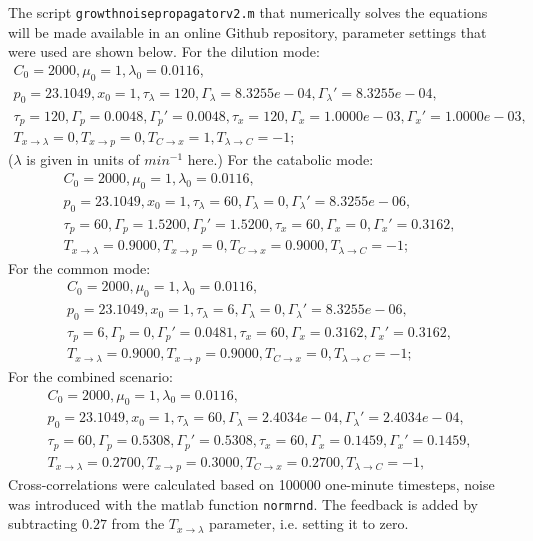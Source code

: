 The script \texttt{growthnoisepropagatorv2.m} that numerically solves the equations will be made available in an online Github repository, parameter settings that were used are shown below.
%
For the dilution mode: 
\begin{gather*}
C_0= 2000,
\mu_0= 1,
\lambda_0= 0.0116, 
\nonumber \\ p_0= 23.1049, 
x_0= 1,
\tau_\lambda= 120,
\Gamma_\lambda= 8.3255e-04,
\Gamma_\lambda'= 8.3255e-04,
\nonumber \\ \tau_p= 120,
\Gamma_p= 0.0048,
\Gamma_p'= 0.0048,
\tau_x= 120,
\Gamma_x= 1.0000e-03,
\Gamma_x'= 1.0000e-03,
\nonumber \\ T_{x\rightarrow\lambda}= 0,
T_{x\rightarrow{p}}= 0,
T_{C\rightarrow{x}}= 1,
T_{\lambda\rightarrow{C}}= -1;
\end{gather*}
%
($\lambda$ is given in units of $min^{-1}$ here.)
For the catabolic mode: 
\begin{gather*}
C_0= 2000,
\mu_0= 1,
\lambda_0= 0.0116,
\nonumber \\ p_0= 23.1049,
x_0= 1,
\tau_\lambda= 60,
\Gamma_\lambda= 0,
\Gamma_\lambda'= 8.3255e-06,
\nonumber \\ \tau_p= 60,
\Gamma_p= 1.5200,
\Gamma_p'= 1.5200,
\tau_x= 60,
\Gamma_x= 0,
\Gamma_x'= 0.3162,
\nonumber \\ T_{x\rightarrow\lambda}= 0.9000,
T_{x\rightarrow{p}}= 0,
T_{C\rightarrow{x}}= 0.9000,
T_{\lambda\rightarrow{C}}= -1;
\end{gather*}
For the common mode: 
\begin{gather*}
C_0= 2000,
\mu_0= 1,
\lambda_0= 0.0116,
\nonumber \\p_0= 23.1049,
x_0= 1,
\tau_\lambda= 6,
\Gamma_\lambda= 0,
\Gamma_\lambda'= 8.3255e-06,
\nonumber \\ \tau_p= 6,
\Gamma_p= 0,
\Gamma_p'= 0.0481,
\tau_x= 60,
\Gamma_x= 0.3162,
\Gamma_x'= 0.3162,
\nonumber \\ T_{x\rightarrow\lambda}= 0.9000,
T_{x\rightarrow{p}}= 0.9000,
T_{C\rightarrow{x}}= 0,
T_{\lambda\rightarrow{C}}= -1;
\end{gather*}
For the combined scenario: 
\begin{gather*}
C_0= 2000,
\mu_0= 1,
\lambda_0= 0.0116,
\nonumber \\p_0= 23.1049,
x_0= 1,
\tau_\lambda= 60,
\Gamma_\lambda= 2.4034e-04,
\Gamma_\lambda'= 2.4034e-04,
\nonumber \\ \tau_p= 60,
\Gamma_p= 0.5308,
\Gamma_p'= 0.5308,
\tau_x= 60,
\Gamma_x= 0.1459,
\Gamma_x'= 0.1459,
\nonumber \\ T_{x\rightarrow\lambda}= 0.2700,
T_{x\rightarrow{p}}= 0.3000,
T_{C\rightarrow{x}}= 0.2700,
T_{\lambda\rightarrow{C}}= -1,
\end{gather*}
%
Cross-correlations were calculated based on 100000 one-minute timesteps, noise was introduced with the matlab function \texttt{normrnd}.
% 
The feedback is added by subtracting $0.27$ from the $T_{x\rightarrow\lambda}$ parameter, i.e. setting it to zero.

